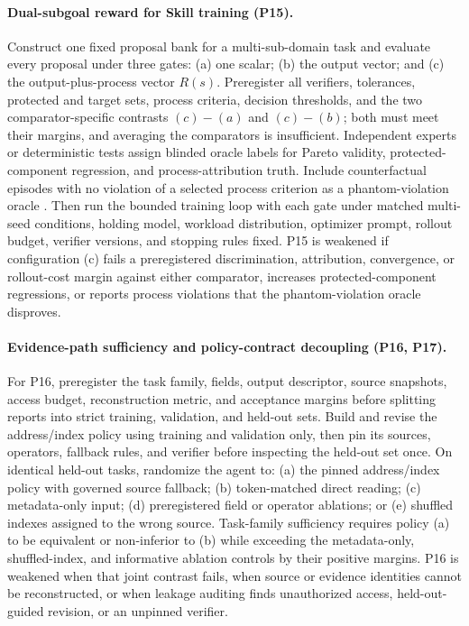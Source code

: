 \documentclass[11pt]{article}
\begin{document}
\paragraph{Dual-subgoal reward for Skill training (P15).}
Construct one fixed proposal bank for a multi-sub-domain task and evaluate every proposal under three gates: (a) one scalar; (b) the output vector; and (c) the output-plus-process vector $R(s)$. Preregister all verifiers, tolerances, protected and target sets, process criteria, decision thresholds, and the two comparator-specific contrasts $(c)-(a)$ and $(c)-(b)$; both must meet their margins, and averaging the comparators is insufficient. Independent experts or deterministic tests assign blinded oracle labels for Pareto validity, protected-component regression, and process-attribution truth. Include counterfactual episodes with no violation of a selected process criterion as a phantom-violation oracle \cite{wang2026phantom}. Then run the bounded training loop with each gate under matched multi-seed conditions, holding model, workload distribution, optimizer prompt, rollout budget, verifier versions, and stopping rules fixed. P15 is weakened if configuration (c) fails a preregistered discrimination, attribution, convergence, or rollout-cost margin against either comparator, increases protected-component regressions, or reports process violations that the phantom-violation oracle disproves.

\paragraph{Evidence-path sufficiency and policy-contract decoupling (P16, P17).}
For P16, preregister the task family, fields, output descriptor, source snapshots, access budget, reconstruction metric, and acceptance margins before splitting reports into strict training, validation, and held-out sets. Build and revise the address/index policy using training and validation only, then pin its sources, operators, fallback rules, and verifier before inspecting the held-out set once. On identical held-out tasks, randomize the agent to: (a) the pinned address/index policy with governed source fallback; (b) token-matched direct reading; (c) metadata-only input; (d) preregistered field or operator ablations; or (e) shuffled indexes assigned to the wrong source. Task-family sufficiency requires policy (a) to be equivalent or non-inferior to (b) while exceeding the metadata-only, shuffled-index, and informative ablation controls by their positive margins. P16 is weakened when that joint contrast fails, when source or evidence identities cannot be reconstructed, or when leakage auditing finds unauthorized access, held-out-guided revision, or an unpinned verifier.
\end{document}
